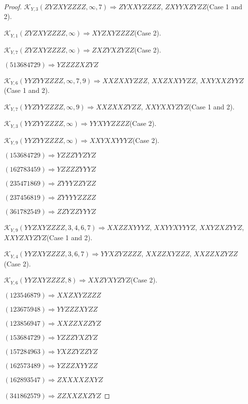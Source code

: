 \documentclass[12pt]{article}
\theoremstyle{plain}
\theoremstyle{definition}
\theoremstyle{remark}
\newcommand{\fancy}[1]{\mathcal{#1}}
\def\K{\fancy{K}}
\begin{document}
\begin{proof}
	$\K_{Y,3}(ZYZXYZZZZ,\infty,7)\Rightarrow $$ZYXXYZZZZ$, $ZXYYXZYZZ$(Case 1 and 2).
	
	$\K_{Y,1}(ZYZXYZZZZ,\infty)\Rightarrow $$XYZXYZZZZ$(Case 2).
	
	$\K_{Y,7}(ZYZXYZZZZ,\infty)\Rightarrow $$ZXZYXZYZZ$(Case 2).
	
	
	
	$(5 1 3 6 8 4 7 2 9)\Rightarrow YZZZZXZYZ$
	
	
	
	$\K_{Y,6}(YYZYYZZZZ,\infty,7, 9)\Rightarrow $$XXZXXYZZZ$, $XXZXXYYZZ$, $XXYXXZYYZ$(Case 1 and 2).
	
	$\K_{Y,7}(YYZYYZZZZ,\infty,9)\Rightarrow $$XXZXXZYZZ$, $XXYXXYZYZ$(Case 1 and 2).
	
	$\K_{Y,3}(YYZYYZZZZ,\infty)\Rightarrow $$YYXYYZZZZ$(Case 2).
	
	$\K_{Y,9}(YYZYYZZZZ,\infty)\Rightarrow $$XXYXXYYYZ$(Case 2).
	
	
	
	$(1 5 3 6 8 4 7 2 9)\Rightarrow YZZZYYZYZ$
	
	$(1 6 2 7 8 3 4 5 9)\Rightarrow YZZZZYYYZ$
	
	$(2 3 5 4 7 1 8 6 9)\Rightarrow ZYYYZZYZZ$
	
	$(2 3 7 4 5 6 8 1 9)\Rightarrow ZYYYYZZZZ$
	
	$(3 6 1 7 8 2 5 4 9)\Rightarrow ZZYZZYYYZ$
	
	
	
	$\K_{Y,9}(YYZXYZZZZ,3, 4, 6, 7)\Rightarrow $$XXZZXYYYZ$, $XXYYXYYYZ$, $XXYZXZYYZ$, $XXYZXYZYZ$(Case 1 and 2).
	
	$\K_{Y,4}(YYZXYZZZZ,3, 6, 7)\Rightarrow $$YYXZYZZZZ$, $XXZZXYZZZ$, $XXZZXZYZZ$(Case 2).
	
	$\K_{Y,6}(YYZXYZZZZ,8)\Rightarrow $$XXZYXYZYZ$(Case 2).
	
	
	
	$(1 2 3 5 4 6 8 7 9)\Rightarrow XXZXYZZZZ$
	
	$(1 2 3 6 7 5 9 4 8)\Rightarrow YYZZZXYZZ$
	
	$(1 2 3 8 5 6 9 4 7)\Rightarrow XXZZXZZYZ$
	
	$(1 5 3 6 8 4 7 2 9)\Rightarrow YZZZYXZYZ$
	
	$(1 5 7 2 8 4 9 6 3)\Rightarrow YXZZYZZYZ$
	
	$(1 6 2 5 7 3 4 8 9)\Rightarrow YZZZXYYZZ$
	
	$(1 6 2 8 9 3 5 4 7)\Rightarrow ZXXXXZXYZ$
	
	$(3 4 1 8 6 2 5 7 9)\Rightarrow ZZXXZXZYZ$
	

\end{proof}
\end{document}
